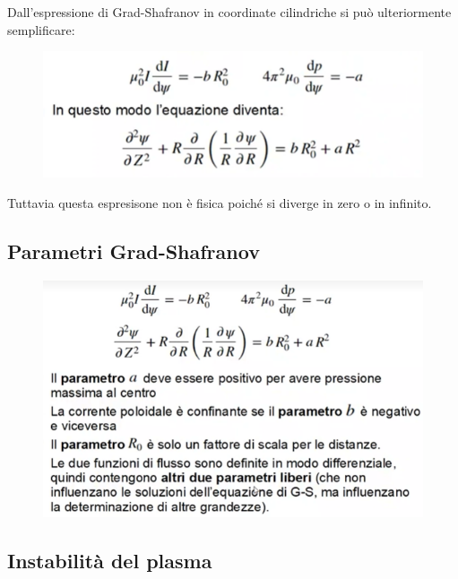 \documentclass{article}
\begin{document}
Dall'espressione di Grad-Shafranov in coordinate cilindriche si può ulteriormente semplificare:
\begin{figure}
	\includegraphics[scale=0.4]{2022-06-26-16-38-00.png}%
\end{figure}
Tuttavia questa espresisone non è fisica poiché si diverge in zero o in infinito.
\subsection{Parametri Grad-Shafranov}
\begin{figure}[h]
	\centering
	\includegraphics[scale=0.4]{2022-06-26-16-40-19.png}%
\end{figure}
\subsection{Instabilità del plasma}
\end{document}
